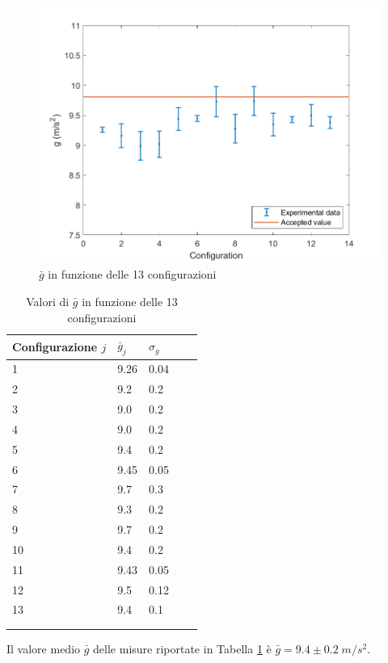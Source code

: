 \documentclass[11pt,a4paper]{article}
\begin{document}
\begin{figure}[H]
    \centering
    \includegraphics[scale=0.6]{img/plot5.png}
    \caption{$\bar{g}$ in funzione delle 13 configurazioni}
    \label{fig:gmconf}
\end{figure}


\begin{longtable}[]{@{}lllll@{}}
    \toprule
    Configurazione $j$ & $\bar{g}_j$ & $\sigma_g$ \tabularnewline
    \midrule
    \endhead
1 & 9.26 & 0.04 \tabularnewline
2 & 9.2 & 0.2 \tabularnewline
3 & 9.0 & 0.2 \tabularnewline
4 & 9.0 & 0.2 \tabularnewline
5 & 9.4 & 0.2 \tabularnewline
6 & 9.45 & 0.05 \tabularnewline
7 & 9.7 & 0.3 \tabularnewline
8 & 9.3 & 0.2 \tabularnewline
9 & 9.7 & 0.2 \tabularnewline
10 & 9.4 & 0.2 \tabularnewline
11 & 9.43 & 0.05 \tabularnewline
12 & 9.5 & 0.12 \tabularnewline
13 & 9.4 & 0.1 \tabularnewline
    \bottomrule
    \\
    \caption{Valori di $\bar{g}$ in funzione delle 13 configurazioni}
    \label{tab:gm}
\end{longtable}

Il valore medio $\bar{g}$ delle misure riportate in Tabella \ref{tab:gm} è $\bar{g} = 9.4 \pm 0.2 \; m/s^2$.
\end{document}
